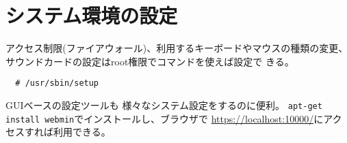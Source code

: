 \documentclass{jreport}
\begin{document}
\section{システム環境の設定}
アクセス制限(ファイアウォール)、利用するキーボードやマウスの種類の変更、
サウンドカードの設定はroot権限でコマンドを使えば設定で
きる。
\begin{screen}
\begin{verbatim}
  # /usr/sbin/setup
\end{verbatim}
\end{screen}

GUIベースの設定ツールも
様々なシステム設定をするのに便利。
\verb|apt-get install webmin|でインストールし、ブラウザで
\url{https://localhost:10000/}にアクセスすれば利用できる。



 
 
\end{document}
